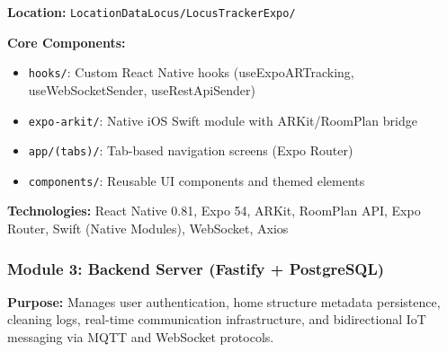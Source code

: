\documentclass[conference]{IEEEtran}
\begin{document}
\textbf{Location:} \texttt{LocationDataLocus/LocusTrackerExpo/}

\textbf{Core Components:}
\begin{itemize}
    \item \texttt{hooks/}: Custom React Native hooks (useExpoARTracking, useWebSocketSender, useRestApiSender)
    \item \texttt{expo-arkit/}: Native iOS Swift module with ARKit/RoomPlan bridge
    \item \texttt{app/(tabs)/}: Tab-based navigation screens (Expo Router)
    \item \texttt{components/}: Reusable UI components and themed elements
\end{itemize}

\textbf{Technologies:} React Native 0.81, Expo 54, ARKit, RoomPlan API, Expo Router, Swift (Native Modules), WebSocket, Axios

\subsubsection{Module 3: Backend Server (Fastify + PostgreSQL)}

\textbf{Purpose:} Manages user authentication, home structure metadata persistence, cleaning logs, real-time communication infrastructure, and bidirectional IoT messaging via MQTT and WebSocket protocols.
\end{document}
